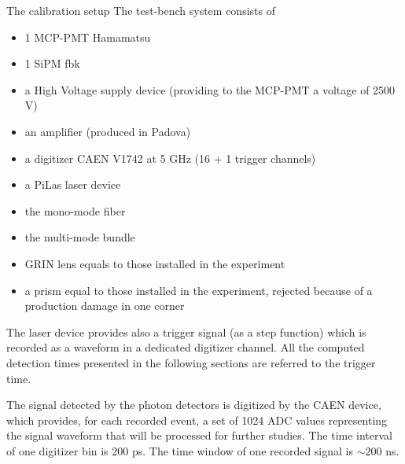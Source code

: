 \documentclass[a4paper,11pt]{article}
\begin{document}
\begin{subsection}{The calibration setup}
The test-bench system consists of
\begin{itemize}
\item 1 MCP-PMT Hamamatsu
\item 1 SiPM fbk
\item a High Voltage supply device (providing to the MCP-PMT a voltage of 2500 V)
\item an amplifier (produced in Padova)
\item a digitizer CAEN V1742  at 5 GHz (16 + 1 trigger channels)
\item a PiLas laser device
\item the mono-mode fiber 
\item the multi-mode bundle
\item GRIN lens equals to those installed in the experiment
\item a prism equal to those installed in the experiment, rejected because of a production damage in one corner
\end{itemize}

The laser device provides also a trigger signal (as a step function) which is recorded as a waveform in a dedicated digitizer channel. All the computed detection times presented in the following sections are referred to the trigger time.

The signal detected by the photon detectors is digitized by the CAEN device, which provides, for each recorded event, a set of 1024 ADC values representing the signal waveform that will be processed for further studies. The time interval of one digitizer bin is 200 ps. The time window of one recorded signal is $\sim 200$ ns. 



\end{subsection}
\end{document}
